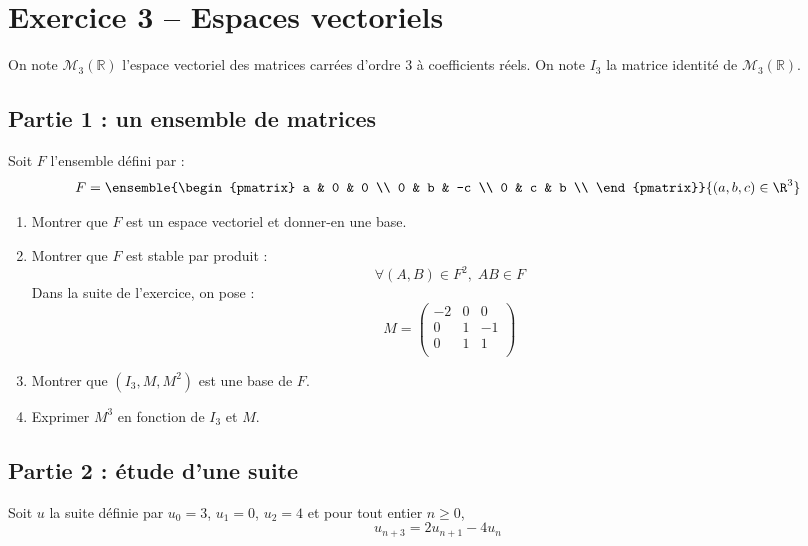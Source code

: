 \documentclass[twoside,french,11pt]{VcCours}
\begin{document}
  
\section*{Exercice 3 -- Espaces vectoriels}
On note $\mathcal{M}_3(\mathbb{R})$ l'espace vectoriel des matrices carrées 
d'ordre $3$ à coefficients réels. On note $I_3$ la matrice identité de 
$\mathcal{M}_3(\mathbb{R})$.

\subsection*{Partie 1 : un ensemble de matrices}
Soit $F$ l'ensemble défini par :
$$ F = \ensemble{\begin{pmatrix}
a & 0 & 0 \\
0 & b & -c \\
0 & c & b \\
\end{pmatrix}}{(a,b,c) \in \R^3}$$

\begin{enumerate}
\item Montrer que $F$ est un espace vectoriel et donner-en une base.
\item Montrer que $F$ est stable par produit :
$$ \forall (A,B) \in F^2, \; AB \in F$$
Dans la suite de l'exercice, on pose :
$$ M = \begin{pmatrix}
-2 & 0 & 0 \\
0 & 1 & -1 \\
0 & 1 & 1 \\
\end{pmatrix}$$
\item Montrer que $(I_3,M,M^2)$ est une base de $F$.
\item Exprimer $M^3$ en fonction de $I_3$ et $M$.
\end{enumerate}


\subsection*{Partie 2 : étude d'une suite}


Soit $u$ la suite définie par $u_0=3$, $u_1=0$, $u_2=4$ et pour tout entier $n \geq 0$,
$$ u_{n+3}= 2u_{n+1}-4u_n$$

\medskip
\end{document}
